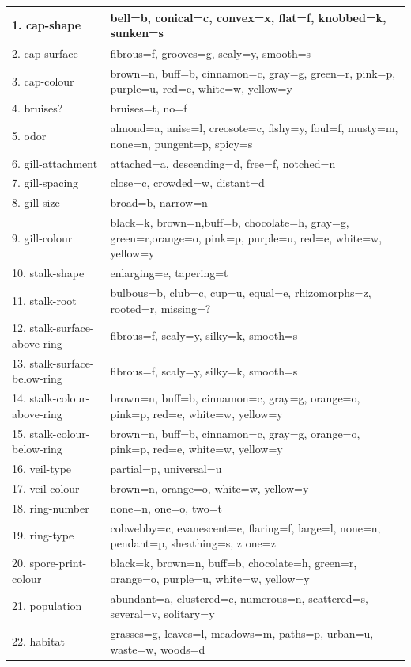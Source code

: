 \documentclass[12pt]{book}
\begin{document}
\begin{center}
\begin{tabularx}{\linewidth}{ |l|X| }
 \hline
 1. cap-shape & bell=b, conical=c, convex=x, flat=f, knobbed=k, sunken=s \\
 \hline
 2. cap-surface & fibrous=f, grooves=g, scaly=y, smooth=s \\
 \hline
 3. cap-colour & brown=n, buff=b, cinnamon=c, gray=g, green=r, pink=p, purple=u, red=e, white=w, yellow=y \\ \hline 4. bruises? & bruises=t, no=f \\
 \hline
 5. odor & almond=a, anise=l, creosote=c, fishy=y, foul=f, musty=m, none=n, pungent=p, spicy=s \\ \hline 6. gill-attachment & attached=a, descending=d, free=f, notched=n \\
 \hline
 7. gill-spacing & close=c, crowded=w, distant=d \\ \hline 8. gill-size & broad=b, narrow=n \\
 \hline
 9. gill-colour & black=k, brown=n,buff=b, chocolate=h, gray=g, green=r,orange=o, pink=p, purple=u, red=e, white=w, yellow=y \\
 \hline
 10. stalk-shape & enlarging=e, tapering=t \\ \hline 11. stalk-root & bulbous=b, club=c, cup=u, equal=e, rhizomorphs=z, rooted=r, missing=? \\
\hline
 12. stalk-surface-above-ring & fibrous=f, scaly=y, silky=k, smooth=s \\ \hline 13. stalk-surface-below-ring & fibrous=f, scaly=y, silky=k, smooth=s \\
\hline
 14. stalk-colour-above-ring & brown=n, buff=b, cinnamon=c, gray=g, orange=o, pink=p, red=e, white=w, yellow=y \\
\hline
 15. stalk-colour-below-ring & brown=n, buff=b, cinnamon=c, gray=g, orange=o, pink=p, red=e, white=w, yellow=y \\
\hline
 16. veil-type & partial=p, universal=u \\ \hline 17. veil-colour & brown=n, orange=o, white=w, yellow=y \\ \hline 18. ring-number & none=n, one=o, two=t \\
 \hline
 19. ring-type & cobwebby=c, evanescent=e, flaring=f, large=l, none=n, pendant=p, sheathing=s, z one=z \\
 \hline
 20. spore-print-colour & black=k, brown=n, buff=b, chocolate=h, green=r, orange=o, purple=u, white=w, yellow=y \\
 \hline
 21. population & abundant=a, clustered=c, numerous=n, scattered=s, several=v, solitary=y \\ \hline 22. habitat & grasses=g, leaves=l, meadows=m, paths=p, urban=u, waste=w, woods=d \\
\hline
\end{tabularx}
\end{center}
\end{document}
